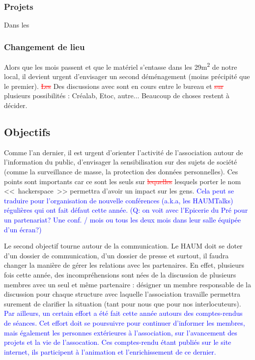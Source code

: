 \documentclass[11pt]{article}
\newcommand{\fs}[1]{\textcolor{red}{\sout{#1}}}
\newcommand{\f}[1]{\textcolor{blue}{#1}}
\begin{document}
\subsubsection{Projets}
\label{ssec:projects}

Dans les 

\subsubsection{Changement de lieu}

Alors que les mois passent et que le matériel s'entasse dans les 29m\textsuperscript{2} de notre local, il devient
urgent d'envisager un second déménagement (moins précipité que le premier). \fs{Les} Des discussions avec sont en cours entre le bureau et \fs{sur} plusieurs
possibilités : Créalab, Etoc, autre... Beaucoup de choses restent à décider.

\subsection{Objectifs}

Comme l'an dernier, il est urgent d'orienter l'activité de l'association autour de l'information du public, d'envisager
la sensibilisation sur des sujets de société (comme la surveillance de masse, la protection des données personnelles).
Ces points sont importants car ce sont les seuls sur \fs{lequelles} lesquels porter le nom <<~hackerspace~>> permettra d'avoir un
impact sur les gens.
\f{Cela peut se traduire pour l'organisation de nouvelle conf\'erences (a.k.a, les HAUMTalks) r\'eguli\`eres qui ont fait d\'efaut cette ann\'ee. (Q: on voit avec l'Epicerie du Pr\'e pour un partenariat? Une conf. / mois ou tous les deux mois dans leur salle \'equip\'ee d'un \'ecran?)} 

Le second objectif tourne autour de la communication.
Le HAUM doit se doter d'un dossier de communication, d'un dossier
de presse et surtout, il faudra changer la manière de gérer les relations avec les partenaires.
En effet, plusieurs fois cette année, des incompréhensions sont nées de la discussion de plusieurs membres avec un seul
et même partenaire : désigner un membre responsable de la discussion pour chaque structure avec laquelle l'association
travaille permettra surement de clarifier la situation (tant pour nous que pour nos interlocuteurs).\\
\f{Par ailleurs, un certain effort a \'et\'e fait cette ann\'ee autours des comptes-rendus de s\'eances. Cet effort doit se poursuivre pour continuer d'informer les membres, mais \'egalement les personnes ext\'erieures \`a l'association, sur l'avancement des projets et la vie de l'assocation. Ces comptes-rendu \'etant publi\'es sur le site internet, ils participent \`a l'animation et l'enrichissement de ce dernier.} 
\end{document}
